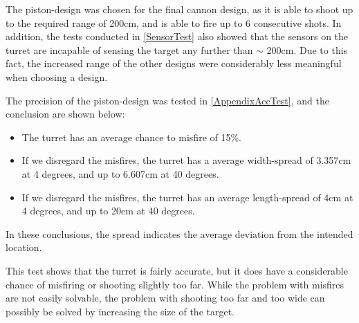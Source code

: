 The piston-design was chosen for the final cannon design, as it is able to
shoot up to the required range of 200cm, and is able to fire up to 6
consecutive shots. In addition, the tests conducted in \autoref{SensorTest} also
showed that the sensors on the turret are incapable of sensing the target any
further than $\sim$ 200cm. Due to this fact, the increased range of the
other designs were considerably less meaningful when choosing a
design.\nl

The precision of the piston-design was tested in \autoref{AppendixAccTest}, and
the conclusion are shown below:

\begin{itemize}
  \item The turret has an average chance to misfire of 15\%.
  \item If we disregard the misfires, the turret has a average width-spread of
  3.357cm at 4 degrees, and up to 6.607cm at 40 degrees.
  \item If we disregard the misfires, the turret has an average length-spread of
  4cm at 4 degrees, and up to 20cm at 40 degrees.
\end{itemize}

In these conclusions, the spread indicates the average deviation from the
intended location.\nl

This test shows that the turret is fairly accurate, but it does
have a considerable chance of misfiring or shooting slightly too far. While the
problem with misfires are not easily solvable, the problem with shooting too far
and too wide can possibly be solved by increasing the size of the target.




